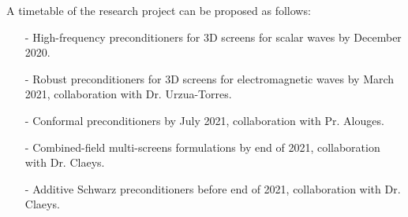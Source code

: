 \documentclass[]{article}
\begin{document}
A timetable of the research project can be proposed as follows:
\begin{itemize}\itemsep-0.2em 
	\item[-] High-frequency preconditioners for 3D screens for scalar waves by December 2020.
	\item[-] Robust preconditioners for 3D screens for electromagnetic waves by March 2021, collaboration with Dr. Urzua-Torres.
	\item[-] Conformal preconditioners by July 2021, collaboration with Pr. Alouges. 
	\item[-] Combined-field multi-screens formulations by end of 2021, collaboration with Dr. Claeys. 
	\item[-] Additive Schwarz preconditioners before end of 2021, collaboration with Dr. Claeys.
\end{itemize}
\end{document}
